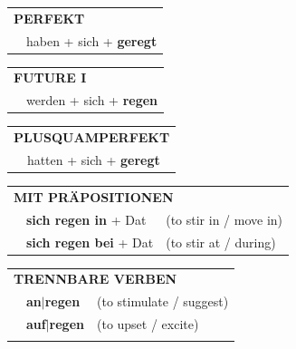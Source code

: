\documentclass[10pt,a4paper]{revtex4-2}
\begin{document}
\begin{verbbox}
 \begin{tabular}{rl}
     \multicolumn{2}{l}{\textbf{PERFEKT}}\\
   & haben + sich + \textbf{geregt}\\
  \end{tabular}
\hfill
   \begin{tabular}{rl}
    \multicolumn{2}{l}{\textbf{FUTURE I} }\\
   & werden + sich + \textbf{regen}\\
  \end{tabular}
\hfill
   \begin{tabular}{rl}
      \multicolumn{2}{l}{\textbf{PLUSQUAMPERFEKT}}\\
   & hatten + sich + \textbf{geregt}\\
  \end{tabular}

   \vspace{10pt}

   \begin{tabular}{lll}
      \multicolumn{3}{l}{\textbf{MIT PRÄPOSITIONEN}}\\
& \textbf{sich regen in} + Dat & (to stir in / move in)\\
& \textbf{sich regen bei} + Dat & (to stir at / during)\\
\end{tabular}
  \hfill
   \begin{tabular}{lll}
      \multicolumn{3}{l}{\textbf{TRENNBARE VERBEN}}\\
 & \textbf{an$|$regen} & (to stimulate / suggest)\\
 & \textbf{auf$|$regen} & (to upset / excite)\\
\vspace{10pt}
  \end{tabular}

  \vspace{-5pt}

\end{verbbox}
\end{document}
